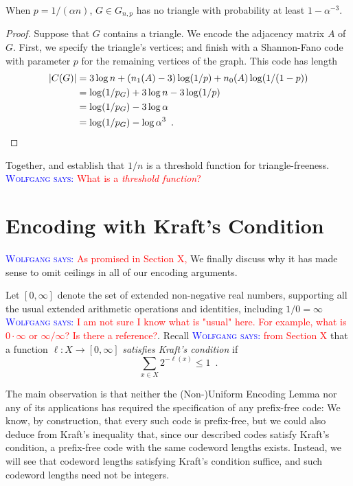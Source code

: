 \documentclass{patmorin}
\newcommand{\aremark}[3]{\textcolor{blue}{\textsc{#1 #2:}}
  \textcolor{red}{\textsf{#3}}}
\newcommand{\wolfgang}[2][says]{\aremark{Wolfgang}{#1}{#2}}
\begin{document}
\begin{thm}
  When $p = 1/(\alpha n)$, $G \in G_{n, p}$ has no triangle with
  probability at least $1 - \alpha^{-3}$.
\end{thm}
\begin{proof}
  Suppose that $G$ contains a triangle. We encode the adjacency matrix
  $A$ of $G$. First, we specify the triangle's vertices; and finish
  with a Shannon-Fano code with parameter $p$ for the remaining
  vertices of the graph. This code has length
  \begin{align*}
    |C(G)| &= 3 \log n + (n_1(A) - 3) \log (1/p) + n_0(A) \log (1/(1 - p)) \\
           &= \log (1/p_G) + 3 \log n - 3 \log (1/p) \\
           &= \log (1/p_G) - 3 \log \alpha \\
           &= \log (1/p_G) - \log \alpha^3 \enspace . \qedhere
  \end{align*}
\end{proof}

Together,  and  establish
that $1/n$ is a threshold function for triangle-freeness.
\wolfgang{What is a \emph{threshold function}?}

\section{Encoding with Kraft's Condition}

\wolfgang{As promised in Section X,}
We finally discuss why it has made sense to omit ceilings in all of
our encoding arguments.

Let $[0, \infty]$ denote the set of extended non-negative real
numbers, supporting all the usual extended arithmetic operations and
identities, including $1/0 = \infty$
\wolfgang{I am not sure I know what is "usual" here. For example,
what is $0 \cdot \infty$ or $\infty/\infty$? Is there
a reference?}. Recall \wolfgang{from Section X} that a function
$\ell : X \to [0, \infty]$ \emph{satisfies Kraft's condition} if
\[
  \sum_{x \in X} 2^{-\ell(x)} \leq 1 \enspace .
\]

The main observation is that neither the (Non-)Uniform Encoding Lemma nor any of its
applications has required the specification of any prefix-free code:
We know, by construction, that every such code is prefix-free, but we
could also deduce from Kraft's inequality that, since our described
codes satisfy Kraft's condition, a prefix-free code with the same
codeword lengths exists. Instead, we will see that codeword lengths
satisfying Kraft's condition suffice, and such codeword lengths need
not be integers.
\end{document}

